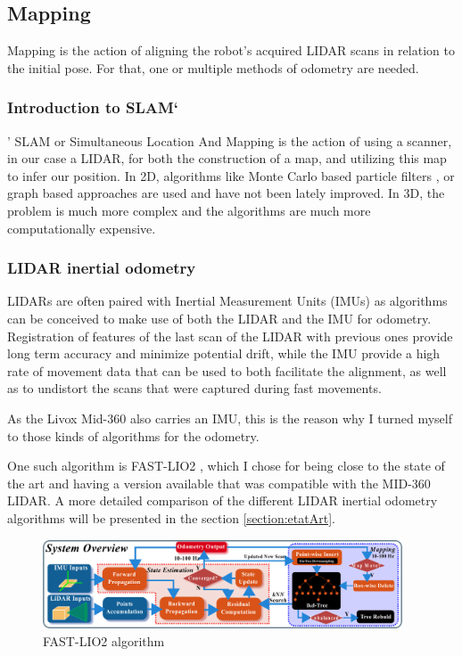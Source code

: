 \documentclass[11pt]{article}
\begin{document}
    \subsection{Mapping}

        Mapping is the action of aligning the robot's acquired LIDAR scans in relation to the initial pose. For that, one or multiple methods of odometry are needed. 
        \subsubsection{Introduction to SLAM`}'
        SLAM or Simultaneous Location And Mapping is the action of using a scanner, in our case a LIDAR, for both the construction of a map, and utilizing this map to infer our position. In 2D, algorithms like Monte Carlo based particle filters \cite{fox1999monte}, or graph based approaches \cite{macenski2021slam} are used and have not been lately improved. In 3D, the problem is much more complex and the algorithms are much more computationally expensive.  


        
        
        \subsubsection{LIDAR inertial odometry}
        \label{section:lidar_inertial_odometry}
        LIDARs are often paired with Inertial Measurement Units (IMUs) as algorithms can be conceived to make use of both the LIDAR and the IMU for odometry. Registration of features of the last scan of the LIDAR with previous ones provide long term accuracy and minimize potential drift, while the IMU provide a high rate of movement data that can be used to both facilitate the alignment, as well as to undistort the scans that were captured during fast movements.
        
        As the Livox Mid-360 also carries an IMU, this is the reason why I turned myself to those kinds of algorithms for the odometry. 
        
        One such algorithm is FAST-LIO2 \cite{xu2022fast}, which I chose for being close to the state of the art and having a version available that was compatible with the MID-360 LIDAR. A more detailed comparison of the different LIDAR inertial odometry algorithms will be presented in the section \ref{section:etatArt}.
        
        
        \begin{figure}[h]
            \centering
            \includegraphics[width=0.95\textwidth]{Images/overview_fastlio2.png}
            \caption{FAST-LIO2 algorithm}
        \end{figure}
        
\end{document}
